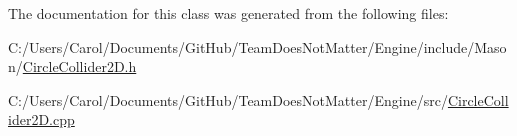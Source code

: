 The documentation for this class was generated from the following files\+:\begin{DoxyCompactItemize}
\item 
C\+:/\+Users/\+Carol/\+Documents/\+Git\+Hub/\+Team\+Does\+Not\+Matter/\+Engine/include/\+Mason/\hyperlink{_circle_collider2_d_8h}{Circle\+Collider2\+D.\+h}\item 
C\+:/\+Users/\+Carol/\+Documents/\+Git\+Hub/\+Team\+Does\+Not\+Matter/\+Engine/src/\hyperlink{_circle_collider2_d_8cpp}{Circle\+Collider2\+D.\+cpp}\end{DoxyCompactItemize}
